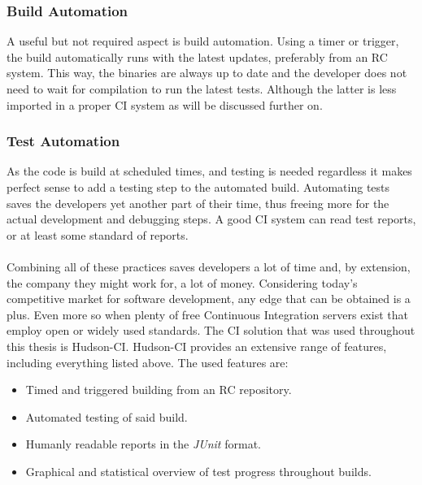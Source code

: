 \documentclass[11pt,british]{article}
\begin{document}
\subsubsection{Build Automation}
A useful but not required aspect is build automation. Using a timer or trigger, the build automatically runs with the latest updates, preferably from an \gls{RC} system. This way, the binaries are always up to date and the developer does not need to wait for compilation to run the latest tests. Although the latter is less imported in a proper \gls{CI} system as will be discussed further on. 

\subsubsection{Test Automation}
As the code is build at scheduled times, and testing is needed regardless it makes perfect sense to add a testing step to the automated build. Automating tests saves the developers yet another part of their time, thus freeing more for the actual development and debugging steps. A good \gls{CI} system can read test reports, or at least some standard of reports. 
\\
\\
Combining all of these practices saves developers a lot of time and, by extension, the company they might work for, a lot of money. Considering today's competitive market for software development, any edge that can be obtained is a plus. Even more so when plenty of free Continuous Integration servers exist that employ open or widely used standards. The \gls{CI} solution that was used throughout this thesis is Hudson-CI. Hudson-CI provides an extensive range of features, including everything listed above. The used features are:
\begin{itemize}
\item Timed and triggered building from an \gls{RC} repository.
\item Automated testing of said build.
\item Humanly readable reports in the \emph{JUnit} format.
\item Graphical and statistical overview of test progress throughout builds.
\end{itemize}

\end{document}
